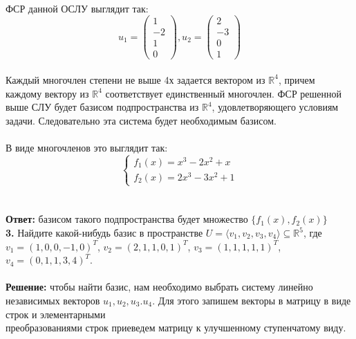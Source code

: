 \documentclass[a4paper, 12pt]{article}
\begin{document}
    \\ ФСР данной ОСЛУ выглядит так:
    \[
        u_1 = \begin{pmatrix}1 \\ -2 \\ 1\\ 0\end{pmatrix},
        u_2 = \begin{pmatrix}2 \\ -3 \\ 0\\ 1\end{pmatrix}
    \]
    \\ Каждый многочлен степени не выше 4х задается вектором из $\mathbb{R}^4$, причем каждому вектору из $\mathbb{R}^4$ соответствует единственный многочлен. ФСР решенной выше СЛУ будет базисом подпространства из $\mathbb{R}^4$, удовлетворяющего условиям задачи. Следовательно эта система будет необходимым базисом.
    \\
    \\ В виде многочленов это выглядит так:
    \begin{equation*}
        \begin{cases}
            f_1(x) = x^3 - 2x^2 + x \\
            f_2(x) = 2x^3 - 3x^2 + 1
        \end{cases}
    \end{equation*}
    \\
    \\ \textbf{Ответ: } базисом такого подпространства будет множество $\{f_1(x), f_2(x)\}$
    \\ \textbf{3. } Найдите какой-нибудь базис в пространстве $U = \langle v_1, v_2, v_3, v_4\rangle \subseteq \mathbb{R}^5$, где $v_1 = (1, 0, 0, -1, 0)^T$, $v_2 = (2, 1, 1, 0, 1)^T$, $v_3=(1, 1, 1, 1, 1)^T$, $v_4=(0, 1, 1, 3, 4)^T$.
    \\
    \\ \textbf{Решение: } чтобы найти базис, нам необходимо выбрать систему линейно независимых векторов $u_1, u_2, u_3. u_4$. Для этого запишем векторы в матрицу в виде строк и элементарными \\ преобразованиями строк приеведем матрицу к улучшенному ступенчатому виду.
\end{document}
